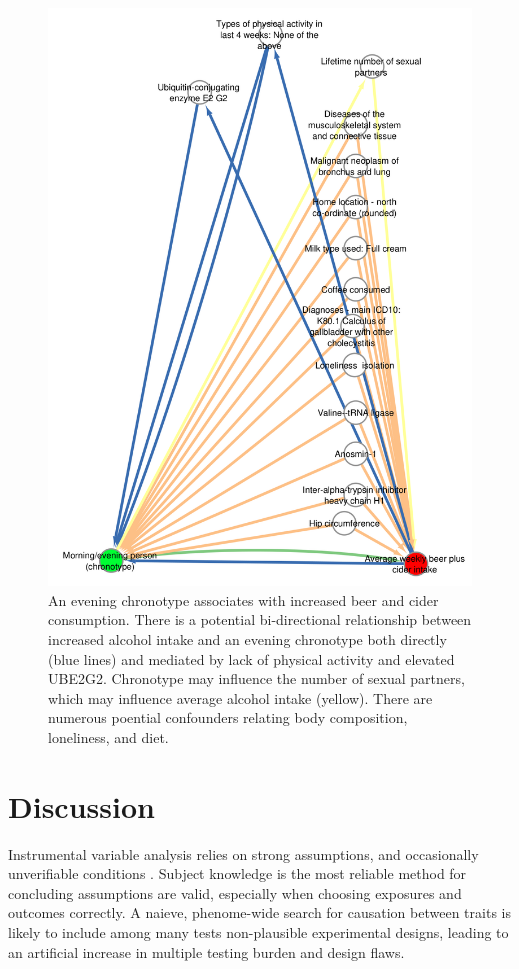 \documentclass[journal,article,submit,moreauthors,pdftex]{Definitions/mdpi}
\begin{document}
\begin{figure}[htbp]
	\centering
	\includegraphics[width=0.7\linewidth]{Figs/Analysis3/chronoBeer.png}
	\caption{An evening chronotype associates with increased beer and cider consumption. There is a potential bi-directional relationship between increased alcohol intake and an evening chronotype both directly (blue lines) and mediated by lack of physical activity and elevated UBE2G2. Chronotype may influence the number of sexual partners, which may influence average alcohol intake (yellow). There are numerous poential confounders relating body composition, loneliness, and diet.}
	\label{chronoBipolar}
\end{figure}





\section{Discussion}
Instrumental variable analysis relies on strong assumptions, and occasionally unverifiable conditions \cite{labrecqueUnderstandingAssumptionsUnderlying2018}. Subject knowledge is the most reliable method for concluding assumptions are valid, especially when choosing exposures and outcomes correctly. A naieve, phenome-wide search for causation between traits is likely to include among many tests non-plausible experimental designs, leading to an artificial increase in multiple testing burden and design flaws.
\end{document}
